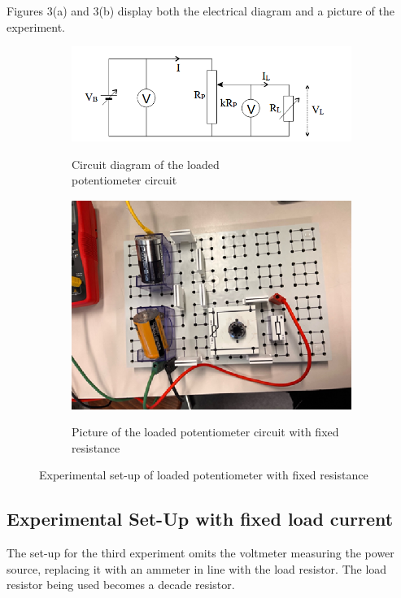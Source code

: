 \documentclass[a4paper]{article}
\begin{document}
Figures 3(a) and 3(b) display both the electrical diagram and a picture of the
experiment.
\begin{figure}[!ht]
    \centering
    \begin{subfigure}{0.5\textwidth}
        \centering
        \includegraphics[width = \linewidth]{loaded pot fixed circuit.png}
        \label{fig:3a}
        \caption{Circuit diagram of the loaded \\potentiometer circuit}
    \end{subfigure}%
    \begin{subfigure}{0.5\textwidth}
        \centering
        \includegraphics[width = 0.8\linewidth]{loaded pot fixed pic.png}
        \label{fig:3b}
        \caption{Picture of the loaded potentiometer circuit with fixed resistance}        
    \end{subfigure}
    \caption{Experimental set-up of loaded potentiometer with fixed resistance}
\end{figure}
\newpage
\subsection{Experimental Set-Up with fixed load current}
The set-up for the third experiment omits the voltmeter measuring the power
source, replacing it with an ammeter in line with the load resistor. The load
resistor being used becomes a decade resistor.
\end{document}

